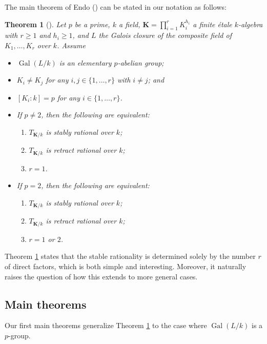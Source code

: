 \documentclass[12pt]{amsart}
\theoremstyle{plain}
\newtheorem{thm}{Theorem}[section]
\theoremstyle{definition}
\numberwithin{thm}{section}
\numberwithin{equation}{section}
\newcommand{\bK}{\mathbf{K}}
\DeclareMathOperator{\Gal}{Gal}
\begin{document}
The main theorem of Endo (\cite{Endo2001}) can be stated in our notation as follows:

\begin{thm}[{\cite[Theorem 2]{Endo2001}}]\label{Endo01Theorem2}
Let $p$ be a prime, $k$ a field, $\bK=\prod_{i=1}^{r}K_{i}^{h_i}$ a finite {\'e}tale $k$-algebra with $r\geq 1$ and $h_i\geq 1$, and $L$ the Galois closure of the composite field of $K_{1},\ldots,K_{r}$ over $k$. 
Assume
\begin{itemize}
\item $\Gal(L/k)$ is an elementary $p$-abelian group;
\item $K_{i}\neq K_{j}$ for any $i,j \in \{1,\ldots,r\}$ with $i\neq j$; and
\item $[K_i:k]=p$ for any $i\in \{1,\ldots,r\}$.
\end{itemize}
\begin{itemize}
    \item[(1)] If $p \neq 2$, then the following are equivalent:
    \begin{enumerate}
        \item $T_{\bK/k}$ is stably rational over $k$; 
        \item $T_{\bK/k}$ is retract rational over $k$;
        \item $r=1$.
    \end{enumerate}
    \item[(2)] If $p=2$, then the following are equivalent:
     \begin{enumerate}
        \item $T_{\bK/k}$ is stably rational over $k$; 
        \item $T_{\bK/k}$ is retract rational over $k$;
        \item $r=1$ or $2$.
    \end{enumerate} 
\end{itemize}
\end{thm}



Theorem \ref{Endo01Theorem2} states that the stable rationality is determined solely by the number $r$ of direct factors, which is both simple and interesting.
Moreover, it naturally raises the question of how this extends to more general cases.

\subsection{Main theorems}

Our first main theorems generalize Theorem \ref{Endo01Theorem2} to the case where $\Gal(L/k)$ is a $p$-group.
\end{document}
